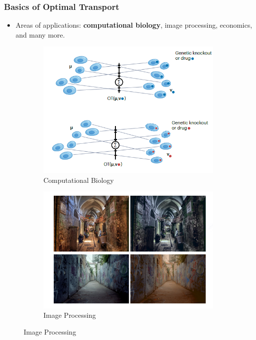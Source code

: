 \documentclass{beamer}
\begin{document}
	\begin{frame}
		\frametitle{Basics of Optimal Transport}
		\begin{itemize}
			\item Areas of applications: \textbf{computational biology}, image processing, economics, and many more.
		\end{itemize}
		\begin{figure}
			\begin{subfigure}{0.4\textwidth}
				\centering
				\includegraphics[width=\textwidth]{comp_bio.png}
				\caption{Computational Biology \cite{bunne2024optimal}}
			\end{subfigure}
			\hfill
			\begin{subfigure}{0.4\textwidth}
				\centering
				\includegraphics[width=\textwidth]{image_processing.png}
				\caption{Image Processing \cite{santambrogio2015optimal}}
			\end{subfigure}
			

\end{figure}
\end{frame}
\end{document}
